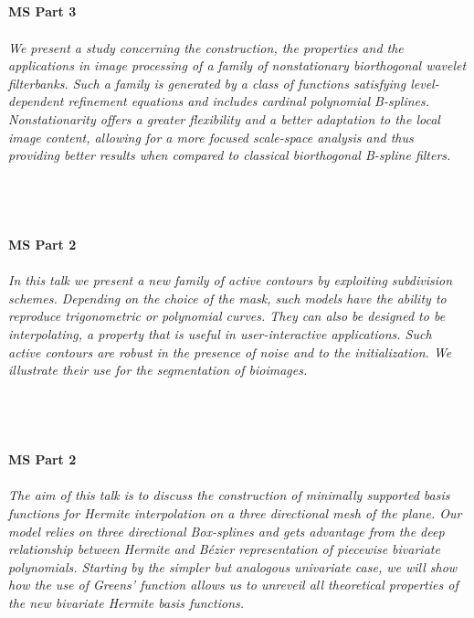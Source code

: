 \begin{multicols}{2}
\\ 
    \\
    \\\\
    \noindent\textbf{MS Part 3}\\
\\  
    \textit{We present a study concerning the construction, the properties and the applications in image processing of a family of nonstationary biorthogonal wavelet filterbanks. Such a family is generated by a class of functions satisfying level-dependent refinement equations and includes cardinal polynomial B-splines. Nonstationarity offers a greater flexibility and a better adaptation to the local image content, allowing for a more focused scale-space analysis and thus providing better results when compared to classical biorthogonal B-spline filters.}\\
\\ 
    \\
    \\\\
    \noindent\textbf{MS Part 2}\\
\\  
    \textit{In this talk we present a new family of active contours by exploiting subdivision schemes. Depending on the choice of the mask, such models have the ability to reproduce trigonometric or polynomial curves. They can also be designed to be interpolating, a property that is useful in user-interactive applications. Such active contours are robust in the presence of noise and to the initialization. We illustrate their use for the segmentation of bioimages.
}\\
\\ 
    \\
    \\\\
    \noindent\textbf{MS Part 2}\\
\\  
    \textit{The aim of this talk is to discuss the construction of minimally supported basis functions for Hermite interpolation on a three directional mesh of the plane. Our model relies on three directional Box-splines and gets advantage from the deep relationship between Hermite and Bézier representation of piecewise bivariate polynomials. Starting by the simpler but analogous univariate case, we will show how the use of Greens' function allows us to unreveil all theoretical properties of the new bivariate Hermite basis functions.
}
\end{multicols}
